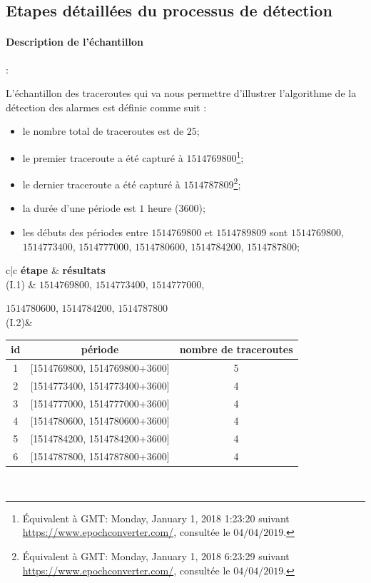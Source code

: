 \subsection{Etapes détaillées du processus de détection}

\paragraph{Description de  l'échantillon} :

L'échantillon des traceroutes qui va nous permettre d'illustrer l'algorithme de la détection des alarmes est définie comme suit :

\begin{itemize}
	\item le nombre total de traceroutes est de $25$;
	\item le premier traceroute a été capturé à $1514769800$\footnote{Équivalent à GMT: Monday, January 1, 2018 1:23:20 suivant \url{https://www.epochconverter.com/}, consultée le $04/04/2019$.};
	\item le dernier traceroute a été capturé à $1514787809$\footnote{Équivalent à GMT: Monday, January 1, 2018 6:23:29 suivant \url{https://www.epochconverter.com/}, consultée le $04/04/2019$.};
	\item la durée d'une période est $1$ heure ($3600$);
	\item les débuts des périodes entre $ 1514769800 $ et $ 1514789809 $ sont  $ 1514769800 $, $ 1514773400 $, $ 1514777000 $, $ 1514780600 $, $ 1514784200 $, $ 1514787800 $;
\end{itemize} 




\begin{table}[H]
	\centering
	\begin{tabular}{c|c}
		\textbf{étape} &  \textbf{résultats}	\\ \hline
		(I.1) &   $ 1514769800 $, $ 1514773400 $, $ 1514777000 $,
		
		$ 1514780600 $, $ 1514784200 $, $ 1514787800 $\\ \hline
		(I.2)& 
		\begin{tabular}{ccc}
			\textbf{id}&	\textbf{période}&\textbf{nombre de traceroutes} \\ \hline
			1&	[1514769800, 1514769800+3600] & 5\\ \hline
			2&	[1514773400, 1514773400+3600] & 4\\ \hline
			3&	[1514777000, 1514777000+3600] & 4\\ \hline
			4&	[1514780600, 1514780600+3600] &4 \\ \hline
			5&	[1514784200, 1514784200+3600] &4 \\ \hline
			6&	[1514787800, 1514787800+3600] & 4 \\ \hline
		\end{tabular}\\ \hline
	\end{tabular}
\end{table}

